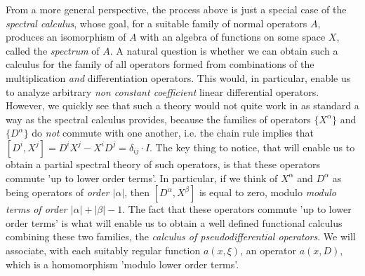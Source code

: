 From a more general perspective, the process above is just a special case of the \emph{spectral calculus}, whose goal, for a suitable family of normal operators $A$, produces an isomorphism of $A$ with an algebra of functions on some space $X$, called the \emph{spectrum} of $A$. A natural question is whether we can obtain such a calculus for the family of all operators formed from combinations of the multiplication \emph{and} differentiation operators. This would, in particular, enable us to analyze arbitrary \emph{non constant coefficient} linear differential operators. However, we quickly see that such a theory would not quite work in as standard a way as the spectral calculus provides, because the families of operators $\{ X^\alpha \}$ and $\{ D^\alpha \}$ do \emph{not} commute with one another, i.e. the chain rule implies that $[D^i,X^j] = D^iX^j - X^iD^j = \delta_{ij} \cdot I$. The key thing to notice, that will enable us to obtain a partial spectral theory of such operators, is that these operators commute 'up to lower order terms'. In particular, if we think of $X^\alpha$ and $D^\alpha$ as being operators of \emph{order $|\alpha|$}, then $[D^\alpha,X^\beta]$ is equal to zero, modulo \emph{modulo terms of order $|\alpha| + |\beta| - 1$}. The fact that these operators commute 'up to lower order terms' is what will enable us to obtain a well defined functional calculus combining these two families, the \emph{calculus of pseudodifferential operators}. We will associate, with each suitably regular function $a(x,\xi)$, an operator $a(x,D)$, which is a homomorphism 'modulo lower order terms'.

